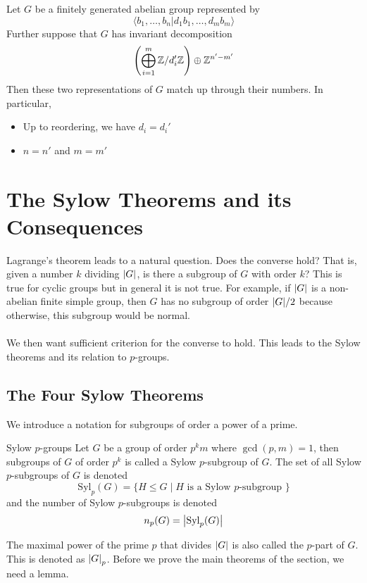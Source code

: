 \documentclass[a4paper]{article}
\begin{document}
\begin{thm}{}{} Let $G$ be a finitely generated abelian group represented by $$\langle b_1,\dots,b_n|d_1b_1,\dots,d_mb_m\rangle$$ Further suppose that $G$ has invariant decomposition $$\left(\bigoplus_{i=1}^m\mathbb{Z}/d_i'\mathbb{Z}\right)\oplus\mathbb{Z}^{n'-m'}$$ Then these two representations of $G$ match up through their numbers. In particular, 
\begin{itemize}
\item Up to reordering, we have $d_i=d_i'$
\item $n=n'$ and $m=m'$
\end{itemize}
\end{thm}

\pagebreak
\section{The Sylow Theorems and its Consequences}
Lagrange's theorem leads to a natural question. Does the converse hold? That is, given a number $k$ dividing $\abs{G}$, is there a subgroup of $G$ with order $k$? This is true for cyclic groups but in general it is not true. For example, if $\abs{G}$ is a non-abelian finite simple group, then $G$ has no subgroup of order $\abs{G}/2$ because otherwise, this subgroup would be normal. \\~\\

We then want sufficient criterion for the converse to hold. This leads to the Sylow theorems and its relation to $p$-groups. 
\subsection{The Four Sylow Theorems}
We introduce a notation for subgroups of order a power of a prime. 

\begin{defn}{Sylow $p$-groups}{} Let $G$ be a group of order $p^km$ where $\gcd(p,m)=1$, then subgroups of $G$ of order $p^k$ is called a Sylow $p$-subgroup of $G$. The set of all Sylow $p$-subgroups of $G$ is denoted $$\text{Syl}_p(G)=\{H\leq G\;|\;H\text{ is a Sylow }p\text{-subgroup }\}$$ and the number of Sylow $p$-subgroups is denoted $$n_p(G)=\abs{\text{Syl}_p(G)}$$ 
\end{defn}

The maximal power of the prime $p$ that divides $\abs{G}$ is also called the $p$-part of $G$. This is denoted as $\abs{G}_p$. Before we prove the main theorems of the section, we need a lemma. 
\end{document}
